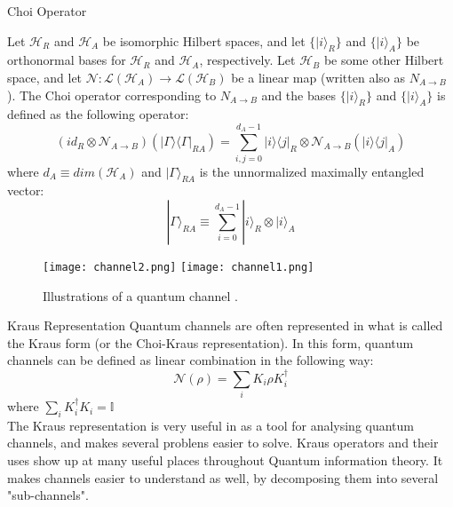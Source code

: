 \begin{frame}{Choi Operator}
    \begin{definition}
        Let $\mathcal{H}_R$ and $\mathcal{H}_A$ be isomorphic Hilbert spaces, and let
        $\{| i\rangle_R \}$ and $\{|i\rangle_A \}$ be orthonormal bases for $\mathcal{H}_R$
        and $\mathcal{H}_A$, respectively. Let $\mathcal{H}_B$ be some other Hilbert space,
        and let $\mathcal{N} : \mathcal{L}(\mathcal{H}_A) \rightarrow \mathcal{L}(\mathcal{H}_B)$
        be a linear map (written also as $N_{A\rightarrow B}$). The Choi operator corresponding
        to $N_{A\rightarrow B}$ and the bases $\{| i\rangle_R \}$ and $\{|i\rangle_A \}$ is defined
        as the following operator:
        \begin{equation*}
            (id_R \otimes \mathcal{N}_{A \rightarrow B})(| \Gamma \rangle\langle \Gamma |_{RA})
            = \displaystyle\sum_{i,j = 0}^{d_A-1}| i \rangle\langle j |_R \otimes \mathcal{N}_{A \rightarrow B}(| i \rangle\langle j |_A)
        \end{equation*}
        where $d_A \equiv dim(\mathcal{H}_A)$ and $| \Gamma \rangle_{RA}$ is the unnormalized maximally entangled vector:
        \begin{equation*}
            | \Gamma \rangle_{RA} \equiv \displaystyle\sum_{i=0}^{d_A - 1} | i \rangle_R \otimes | i \rangle_A
        \end{equation*}
    \end{definition}
\end{frame}

\begin{frame}
    \begin{figure}
        \texttt{[image: channel2.png]}
        \texttt{[image: channel1.png]}
        \caption{Illustrations of a quantum channel \cite{Gyongyosi_2018}.}
    \end{figure}
\end{frame}

\begin{frame}{Kraus Representation}
    Quantum channels are often represented in what is called the Kraus form (or the Choi-Kraus representation). In this form, quantum channels can be defined
    as linear combination in the following way:
    \begin{equation*}
        \mathcal{N}(\rho) = \sum_i K_i \rho K_i^\dagger 
    \end{equation*}
    where $\sum_i K_i^\dagger K_i = \mathbb{I} $\\
    The Kraus representation is very useful in as a tool for analysing quantum channels, and makes several problens easier to solve. Kraus operators and their
    uses show up at many useful places throughout Quantum information theory. It makes channels easier to understand as well, by decomposing them into several
    "sub-channels".
\end{frame}

